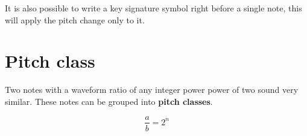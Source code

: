 \documentclass{article}
\begin{document}
\begin{center}
\end{center}

It is also possible to write a key signature symbol right before a single note, this will apply
the pitch change only to it.


\section{Pitch class}

Two notes with a waveform ratio of any integer power power of two
sound very similar. These notes can be grouped into \textbf{pitch classes}.

\[
    \frac{a}{b} = 2^n
\]
\end{document}
